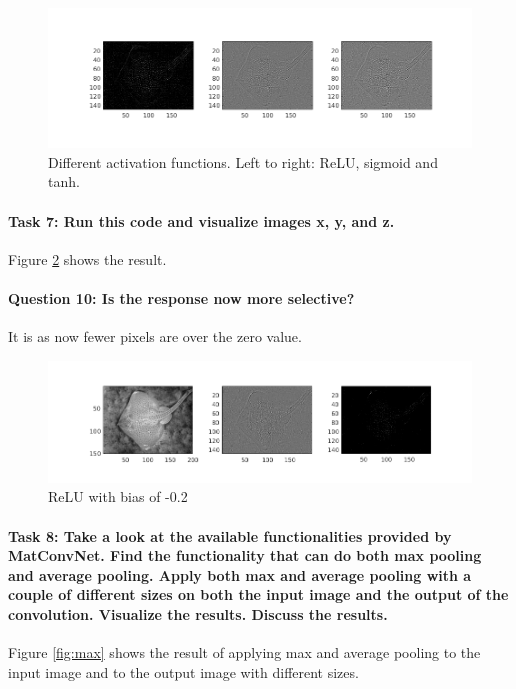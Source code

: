 \documentclass[12pt]{article}
\begin{document}
\begin{figure}[htbp]
 \centering
 \includegraphics[width=\textwidth]{121b}
 \caption{Different activation functions. Left to right: ReLU, sigmoid and tanh.}
 \label{fig:121b}
\end{figure}

\paragraph{Task 7: Run this code and visualize images x, y, and z.} Figure \ref{fig:122} shows the result.
\paragraph{Question 10: Is the response now more selective?} It is as now fewer pixels are over the zero value.

\begin{figure}[htbp]
 \centering
 \includegraphics[width=\textwidth]{122}
 \caption{ReLU with bias of -0.2}
 \label{fig:122}
\end{figure}

\paragraph{Task 8: Take a look at the available functionalities provided by MatConvNet.	Find the functionality that can do both max pooling and average pooling. Apply both max and average pooling with a couple of different sizes on both the input image and the output of the convolution. Visualize the results. Discuss the results.} Figure \ref{fig:max} shows the result of applying max and average pooling to the input image and to the output image with different sizes.
\end{document}
